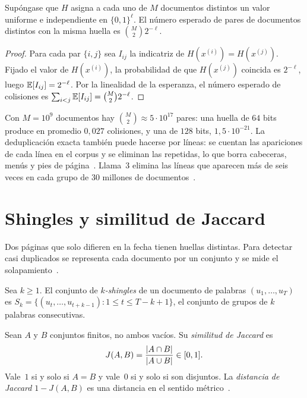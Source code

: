 \begin{proposicion}[Colisiones]\label{prop:colisiones}
Supóngase que $H$ asigna a cada uno de $M$ documentos distintos un valor uniforme e independiente en $\{0,1\}^{\ell}$. El número esperado de pares de documentos distintos con la misma huella es $\binom{M}{2}2^{-\ell}$.
\end{proposicion}

\begin{proof}
Para cada par $\{i,j\}$ sea $I_{ij}$ la indicatriz de $H(x^{(i)})=H(x^{(j)})$. Fijado el valor de $H(x^{(i)})$, la probabilidad de que $H(x^{(j)})$ coincida es $2^{-\ell}$, luego $\mathbb{E}[I_{ij}]=2^{-\ell}$. Por la linealidad de la esperanza, el número esperado de colisiones es $\sum_{i<j}\mathbb{E}[I_{ij}]=\binom{M}{2}2^{-\ell}$.
\end{proof}

Con $M=10^{9}$ documentos hay $\binom{M}{2}\approx 5\cdot 10^{17}$ pares: una huella de $64$ bits produce en promedio $0{,}027$ colisiones, y una de $128$ bits, $1{,}5\cdot 10^{-21}$. La deduplicación exacta también puede hacerse por líneas: se cuentan las apariciones de cada línea en el corpus y se eliminan las repetidas, lo que borra cabeceras, menús y pies de página~\cite[§3.1]{cs336a4}. Llama~3 elimina las líneas que aparecen más de seis veces en cada grupo de $30$ millones de documentos~\cite[§3.1.1]{llama3}.

\section{Shingles y similitud de Jaccard}

Dos páginas que solo difieren en la fecha tienen huellas distintas. Para detectar casi duplicados se representa cada documento por un conjunto y se mide el solapamiento~\cite[§3.1]{mmds}.

\begin{definicion}[Shingles]
Sea $k\ge 1$. El conjunto de \emph{$k$-shingles} de un documento de palabras $(u_1,\dots,u_T)$ es $S_k=\{(u_t,\dots,u_{t+k-1}):1\le t\le T-k+1\}$, el conjunto de grupos de $k$ palabras consecutivas.
\end{definicion}

\begin{definicion}
Sean $A$ y $B$ conjuntos finitos, no ambos vacíos. Su \emph{similitud de Jaccard} es
\[
J(A,B)=\frac{\lvert A\cap B\rvert}{\lvert A\cup B\rvert}\in[0,1].
\]
Vale~$1$ si y solo si $A=B$ y vale~$0$ si y solo si son disjuntos. La \emph{distancia de Jaccard} $1-J(A,B)$ es una distancia en el sentido métrico~\cite[cap.~3]{mmds}.
\end{definicion}

